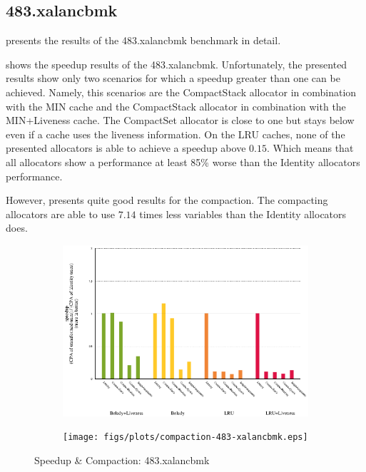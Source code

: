 \documentclass[onecolumn, openright, master, english, signatures]{dbrgrptt}
\begin{document}
\subsection{483.xalancbmk}

 presents the results of the 483.xalancbmk benchmark in detail.

 shows the speedup results of the 483.xalancbmk.
Unfortunately, the presented results show only two scenarios for which a speedup greater than one can be achieved.
Namely, this scenarios are the CompactStack allocator in combination with the \ac{MIN} cache and the CompactStack allocator in combination with the \ac{MIN}+Liveness cache.
The CompactSet allocator is close to one but stays below even if a cache uses the liveness information.
On the \ac{LRU} caches, none of the presented allocators is able to achieve a speedup above $0.15$.
Which means that all allocators show a performance at least 85\% worse than the Identity allocators performance.

However,  presents quite good results for the compaction.
The compacting allocators are able to use $7.14$ times less variables than the Identity allocators does.

\begin{figure}[!ht]
  \begin{subfigure}[b]{0.5\textwidth}%
    \includegraphics[width=\textwidth]{figs/plots/speedup-483-xalancbmk.eps}
    \label{fig:speedup-compaction-483-xalancbmk-speedup}
  \end{subfigure}%
  \begin{subfigure}[b]{0.5\textwidth}%
    \texttt{[image: figs/plots/compaction-483-xalancbmk.eps]}
    \label{fig:speedup-compaction-483-xalancbmk-compaction}
  \end{subfigure}%
  \caption{Speedup \& Compaction: 483.xalancbmk}
  \label{fig:speedup-compaction-483-xalancbmk}
\end{figure}
\end{document}
